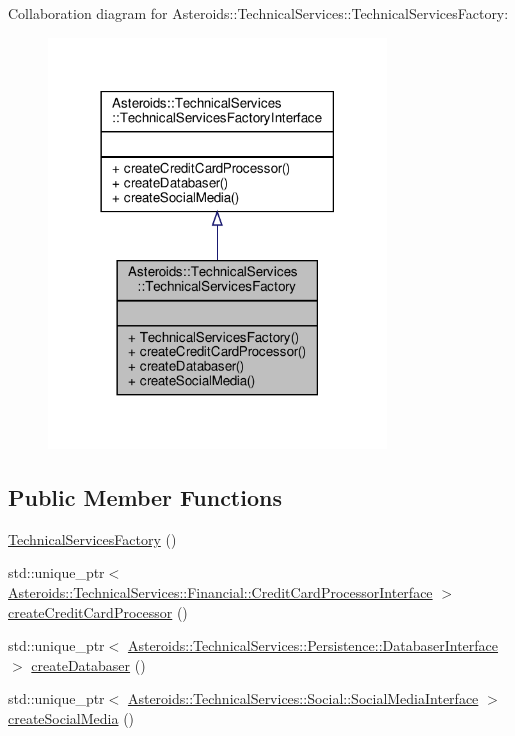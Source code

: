 Collaboration diagram for Asteroids\+:\+:Technical\+Services\+:\+:Technical\+Services\+Factory\+:\nopagebreak
\begin{figure}[H]
\begin{center}
\leavevmode
\includegraphics[width=254pt]{classAsteroids_1_1TechnicalServices_1_1TechnicalServicesFactory__coll__graph}
\end{center}
\end{figure}
\subsection*{Public Member Functions}
\begin{DoxyCompactItemize}
\item 
\hyperlink{classAsteroids_1_1TechnicalServices_1_1TechnicalServicesFactory_a830fba133d7b6092a0eba03a4bdd8208}{Technical\+Services\+Factory} ()
\item 
std\+::unique\+\_\+ptr$<$ \hyperlink{classAsteroids_1_1TechnicalServices_1_1Financial_1_1CreditCardProcessorInterface}{Asteroids\+::\+Technical\+Services\+::\+Financial\+::\+Credit\+Card\+Processor\+Interface} $>$ \hyperlink{classAsteroids_1_1TechnicalServices_1_1TechnicalServicesFactory_aed4827ae821683192b99edd4494c3bea}{create\+Credit\+Card\+Processor} ()
\item 
std\+::unique\+\_\+ptr$<$ \hyperlink{classAsteroids_1_1TechnicalServices_1_1Persistence_1_1DatabaserInterface}{Asteroids\+::\+Technical\+Services\+::\+Persistence\+::\+Databaser\+Interface} $>$ \hyperlink{classAsteroids_1_1TechnicalServices_1_1TechnicalServicesFactory_a86d467c90df00dd759aae317a7d75e57}{create\+Databaser} ()
\item 
std\+::unique\+\_\+ptr$<$ \hyperlink{classAsteroids_1_1TechnicalServices_1_1Social_1_1SocialMediaInterface}{Asteroids\+::\+Technical\+Services\+::\+Social\+::\+Social\+Media\+Interface} $>$ \hyperlink{classAsteroids_1_1TechnicalServices_1_1TechnicalServicesFactory_a26508a6297b0bbcb92370e597bb5fd15}{create\+Social\+Media} ()
\end{DoxyCompactItemize}


